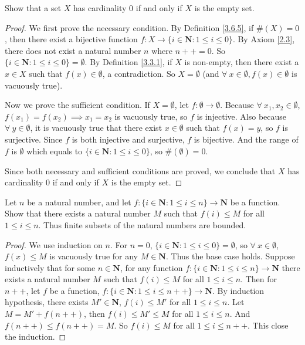 \begin{exercise}\label{ex 3.6.2}
Show that a set \(X\) has cardinality \(0\) if and only if \(X\) is the empty set.
\end{exercise}

\begin{proof}
We first prove the necessary condition.
By Definition \ref{3.6.5}, if \(\#(X) = 0\), then there exist a bijective function \(f : X \to \{i \in \mathbf{N} : 1 \leq i \leq 0\}\).
By Axiom \ref{2.3}, there does not exist a natural number \(n\) where \(n++ = 0\).
So \(\{i \in \mathbf{N} : 1 \leq i \leq 0\} = \emptyset\).
By Definition \ref{3.3.1}, if \(X\) is non-empty, then there exist a \(x \in X\) such that \(f(x) \in \emptyset\), a contradiction.
So \(X = \emptyset\) (and \(\forall\ x \in \emptyset, f(x) \in \emptyset\) is vacuously true).

Now we prove the sufficient condition.
If \(X = \emptyset\), let \(f : \emptyset \to \emptyset\).
Because \(\forall\ x_1, x_2 \in \emptyset\), \(f(x_1) = f(x_2) \implies x_1 = x_2\) is vacuously true, so \(f\) is injective.
Also because \(\forall\ y \in \emptyset\), it is vacuously true that there exist \(x \in \emptyset\) such that \(f(x) = y\), so \(f\) is surjective.
Since \(f\) is both injective and surjective, \(f\) is bijective.
And the range of \(f\) is \(\emptyset\) which equals to \(\{i \in \mathbf{N} : 1 \leq i \leq 0\}\), so \(\#(\emptyset) = 0\).

Since both necessary and sufficient conditions are proved, we conclude that \(X\) has cardinality \(0\) if and only if \(X\) is the empty set.
\end{proof}

\begin{exercise}\label{ex 3.6.3}
Let \(n\) be a natural number, and let \(f : \{i \in \mathbf{N} : 1 \leq i \leq n\} \to \mathbf{N}\) be a function.
Show that there exists a natural number \(M\) such that \(f(i) \leq M\) for all \(1 \leq i \leq n\).
Thus finite subsets of the natural numbers are bounded.
\end{exercise}

\begin{proof}
We use induction on \(n\).
For \(n = 0\), \(\{i \in \mathbf{N} : 1 \leq i \leq 0\} = \emptyset\), so \(\forall\ x \in \emptyset\), \(f(x) \leq M\) is vacuously true for any \(M \in \mathbf{N}\).
Thus the base case holds.
Suppose inductively that for some \(n \in \mathbf{N}\), for any function \(f : \{i \in \mathbf{N} : 1 \leq i \leq n\} \to \mathbf{N}\) there exists a natural number \(M\) such that \(f(i) \leq M\) for all \(1 \leq i \leq n\).
Then for \(n++\), let \(f\) be a function, \(f : \{i \in \mathbf{N} : 1 \leq i \leq n++\} \to \mathbf{N}\).
By induction hypothesis, there exists \(M' \in \mathbf{N}\), \(f(i) \leq M'\) for all \(1 \leq i \leq n\).
Let \(M = M' + f(n++)\), then \(f(i) \leq M' \leq M\) for all \(1 \leq i \leq n\).
And \(f(n++) \leq f(n++) = M\).
So \(f(i) \leq M\) for all \(1 \leq i \leq n++\).
This close the induction.
\end{proof}

